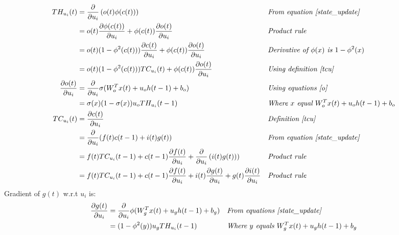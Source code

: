 \documentclass[twoside,11pt]{article}
\begin{document}
\begin{align*}
TH_{u_i}(t) & = \frac{\partial}{\partial u_i} \left ( o(t) \phi(c(t)) \right ) && \textit{From equation \ref{state_update}} \\
& = o(t) \frac{\partial \phi(c(t))}{\partial u_i}  + \phi(c(t)) \frac{\partial o(t)}{\partial u_i}   && \textit{Product rule} \\
&= o(t) (1-\phi^{2}(c(t))) \frac{\partial c(t)}{\partial u_i}  + \phi(c(t)) \frac{\partial o(t)}{\partial u_i}   && \textit{Derivative of $\phi(x)$ is $1-\phi^2(x)$} \\
&= o(t) (1-\phi^{2}(c(t))) TC_{u_{i}}(t)  + \phi(c(t)) \frac{\partial o(t)}{\partial u_i}   && \textit{Using definition \ref{tcu}} \\
\frac{\partial o(t)}{\partial u_i} &=  \frac{\partial}{\partial u_i} \sigma(W_{o}^T x(t) + u_{o} h(t-1) + b_o) && \textit{Using equations \ref{o}}\\
&= \sigma(x)(1-\sigma(x))u_o TH_{u_i}(t-1) && \textit{Where $x$ equal $W_{o}^T x(t) + u_{o} h(t-1) + b_o$} \\
TC_{u_i}(t) &=  \frac{\partial c(t)}{\partial u_i} && \textit{Definition \ref{tcu}} \\ 
&=  \frac{\partial}{\partial u_i} (f(t)  c(t-1) + i(t) g(t))  && \textit{From equation \ref{state_update}} \\
&= f(t) TC_{u_i}(t-1) + c(t-1)\frac{\partial f(t)}{ \partial u_i} + \frac{\partial}{\partial u_i} \left ( i(t) g(t) ) \right )  && \textit{Product rule}\\
&= f(t) TC_{u_i}(t-1) + c(t-1)\frac{\partial f(t)}{ \partial u_i} + i(t)\frac{\partial g(t) }{\partial u_i}  + g(t)\frac{\partial i(t) }{\partial u_i}  && \textit{Product rule} 
\end{align*}
Gradient of  $g(t)$  w.r.t  $u_i$ is:
\begin{align*}
\frac{\partial g(t)}{\partial u_i} &=  \frac{\partial}{\partial u_i} \phi(W_{g}^T x(t) + u_{g} h(t-1) + b_g) && \textit{From equations \ref{state_update}} \\
&= (1-\phi^2(y))u_g TH_{u_i}(t-1) && \textit{Where $y$ equals $W_{g}^T x(t) + u_{g} h(t-1) + b_g$} \\
\end{align*}
\end{document}

